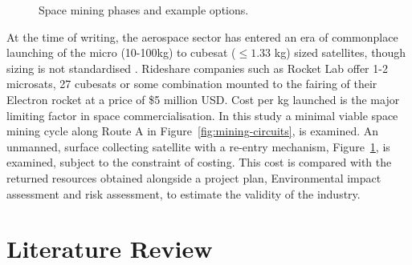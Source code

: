 \documentclass[conference]{IEEEtran}
\begin{document}
\begin{figure}[H]
    \caption{Space mining phases and example options.}
    \label{fig:mining-phases}
\end{figure}

At the time of writing, the aerospace sector has entered an era of commonplace launching of the micro (10-100kg) to cubesat ($\le 1.33$ kg) sized satellites, though sizing is not standardised \cite{sat-sizing}. Rideshare companies such as Rocket Lab offer 1-2 microsats, 27 cubesats or some combination mounted to the fairing of their Electron rocket \cite{rocket-lab-usa-inc-2022} at a price of \$5 million USD. Cost per kg launched is the major limiting factor in space commercialisation. In this study a minimal viable space mining cycle along Route A in Figure~\ref{fig:mining-circuits}, is examined. An unmanned, surface collecting satellite with a re-entry mechanism, Figure~\ref{fig:mining-phases}, is examined, subject to the constraint of costing. This cost is compared with the returned resources obtained alongside a project plan, Environmental impact assessment and risk assessment, to estimate the validity of the industry.

\newpage
\section{Literature Review} \label{sec:lit-review}
\end{document}
